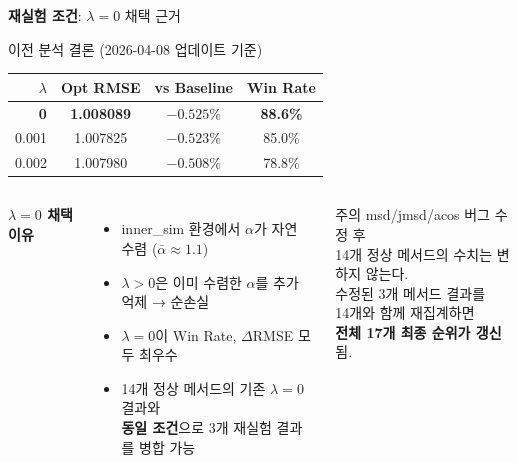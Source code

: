 \documentclass[aspectratio=169,10pt]{beamer}
\begin{document}
\begin{frame}{\textbf{재실험 조건}: $\lambda=0$ 채택 근거}
	\begin{block}{이전 분석 결론 (2026-04-08 업데이트 기준)}
		\begin{center}
		\renewcommand{\arraystretch}{1.25}
		\begin{tabular}{r|c|c|c}
			\toprule
			$\lambda$ & Opt RMSE & vs Baseline & Win Rate \\
			\midrule
			\rowcolor{testgreen!20}
			\textbf{0}     & \textbf{1.008089} & $\mathbf{-0.525\%}$ & \textbf{88.6\%} \\
			0.001  & 1.007825 & $-0.523\%$ & 85.0\% \\
			0.002  & 1.007980 & $-0.508\%$ & 78.8\% \\
			\bottomrule
		\end{tabular}
		\end{center}
	\end{block}

	\vspace{0.3em}
	\begin{columns}[T]
			\textbf{$\lambda=0$ 채택 이유}
			\begin{itemize}
				\item inner\_sim 환경에서 $\alpha$가 자연 수렴 ($\bar\alpha\approx1.1$)
				\item $\lambda>0$은 이미 수렴한 $\alpha$를 추가 억제 → 순손실
				\item $\lambda=0$이 Win Rate, $\Delta$RMSE 모두 최우수
				\item 14개 정상 메서드의 기존 $\lambda=0$ 결과와\\
					\textbf{동일 조건}으로 3개 재실험 결과를 병합 가능
			\end{itemize}

			\begin{alertblock}{주의}
				msd/jmsd/acos 버그 수정 후\\
				14개 정상 메서드의 수치는 변하지 않는다.\\[0.3em]
				수정된 3개 메서드 결과를\\
				14개와 함께 재집계하면\\
				\textbf{전체 17개 최종 순위가 갱신}됨.
			\end{alertblock}
	\end{columns}
\end{frame}

\appendix
\end{document}
